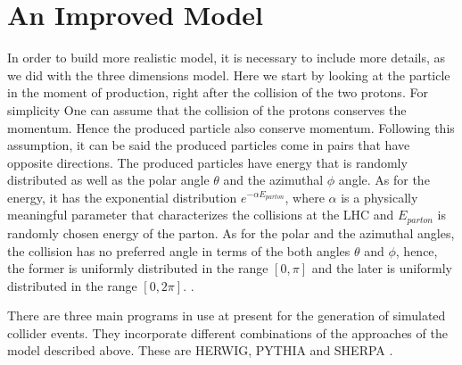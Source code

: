 \section{An Improved Model}
In order to build more realistic model, it is necessary to include more details, as we did with the three dimensions model. Here we start by looking at the particle in the moment of production, right after the collision of the two protons. For simplicity One can assume that the collision of the protons conserves the momentum. Hence the produced particle also conserve momentum.
Following this assumption, it can be said the produced particles come in pairs that have opposite directions. The produced particles have energy that is randomly distributed as well as the polar angle $\theta$ and the azimuthal $\phi$ angle. As for the energy, it has the exponential distribution $e^{- \alpha E_{parton}}$, where $\alpha$ is a physically meaningful parameter that characterizes the collisions at the LHC and $E_{parton}$ is randomly chosen energy of the parton. As for the polar and the azimuthal angles, the collision has no preferred angle in terms of the both angles $\theta$ and $\phi$,
hence, the former is uniformly distributed in the range $[0, \pi]$ and the later is uniformly distributed in the range $[0,2 \pi]$. \citep{Salam:2010zt}.  
%


There are three main programs in use at present for the generation of simulated collider events. They incorporate different combinations of the approaches of the model described above. These are HERWIG, PYTHIA and SHERPA \citep{Buckley:2011ms}.      
